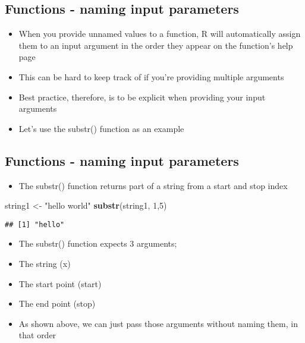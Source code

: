 \documentclass[]{article}
\newenvironment{Shaded}{\begin{snugshade}}{\end{snugshade}}
\newcommand{\KeywordTok}[1]{\textcolor[rgb]{0.13,0.29,0.53}{\textbf{#1}}}
\newcommand{\DecValTok}[1]{\textcolor[rgb]{0.00,0.00,0.81}{#1}}
\newcommand{\StringTok}[1]{\textcolor[rgb]{0.31,0.60,0.02}{#1}}
\newcommand{\NormalTok}[1]{#1}
\providecommand{\tightlist}{%
  \setlength{\itemsep}{0pt}\setlength{\parskip}{0pt}}
\begin{document}
\subsection{Functions - naming input
parameters}\label{functions---naming-input-parameters}

\begin{itemize}
\tightlist
\item
  When you provide unnamed values to a function, R will automatically
  assign them to an input argument in the order they appear on the
  function's help page
\item
  This can be hard to keep track of if you're providing multiple
  arguments
\item
  Best practice, therefore, is to be explicit when providing your input
  arguments
\item
  Let's use the substr() function as an example
\end{itemize}

\subsection{Functions - naming input
parameters}\label{functions---naming-input-parameters-1}

\begin{itemize}
\tightlist
\item
  The substr() function returns part of a string from a start and stop
  index
\end{itemize}

\begin{Shaded}
\begin{Highlighting}[]
\NormalTok{string1 <-}\StringTok{ "hello world"}
\KeywordTok{substr}\NormalTok{(string1, }\DecValTok{1}\NormalTok{,}\DecValTok{5}\NormalTok{)}
\end{Highlighting}
\end{Shaded}

\begin{verbatim}
## [1] "hello"
\end{verbatim}

\begin{itemize}
\tightlist
\item
  The substr() function expects 3 arguments;
\item
  The string (x)
\item
  The start point (start)
\item
  The end point (stop)
\item
  As shown above, we can just pass those arguments without naming them,
  in that order
\end{itemize}
\end{document}
